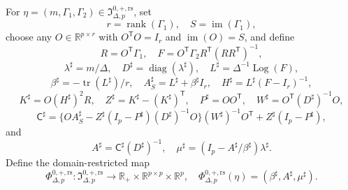 For \(\eta=(m,\Gamma_1,\Gamma_2)\in\mathfrak I_{\Delta,p}^{0,+,\mathrm{rs}}\), set
\[
 r=\operatorname{rank}(\Gamma_1),\quad S=\operatorname{im}(\Gamma_1),
\]
choose any \(O\in\mathbb R^{p\times r}\) with \(O^{\mathsf T}O=I_r\) and \(\operatorname{im}(O)=S\), and define
\[
 R=O^{\mathsf T}\Gamma_1,\quad
 F=O^{\mathsf T}\Gamma_2R^{\mathsf T}(RR^{\mathsf T})^{-1},
\]
\[
 \lambda^\sharp=m/\Delta,\quad D^\sharp=\operatorname{diag}(\lambda^\sharp),
 \quad L^\sharp=\Delta^{-1}\operatorname{Log}(F),
\]
\[
 \beta^\sharp=-\operatorname{tr}(L^\sharp)/r,\quad
 A_S^\sharp=L^\sharp+\beta^\sharp I_r,\quad
 H^\sharp=L^\sharp(F-I_r)^{-1},
\]
\[
 K^\sharp=O(H^\sharp)^2R,\quad
 Z^\sharp=K^\sharp-(K^\sharp)^{\mathsf T},\quad
 P^\sharp=OO^{\mathsf T},\quad
 W^\sharp=O^{\mathsf T}(D^\sharp)^{-1}O,
\]
\[
 \mathsf C^\sharp=
 \{OA_S^\sharp-Z^\sharp(I_p-P^\sharp)(D^\sharp)^{-1}O\}
 (W^\sharp)^{-1}O^{\mathsf T}+Z^\sharp(I_p-P^\sharp),
\]
and
\[
 A^\sharp=\mathsf C^\sharp(D^\sharp)^{-1},\quad
 \mu^\sharp=(I_p-A^\sharp/\beta^\sharp)\lambda^\sharp.
\]
Define the domain-restricted map
\[
 \Phi_{\Delta,p}^{0,+,\mathrm{rs}}:\mathfrak I_{\Delta,p}^{0,+,\mathrm{rs}}
 \longrightarrow\mathbb R_+\times\mathbb R^{p\times p}\times\mathbb R^p,
 \quad
 \Phi_{\Delta,p}^{0,+,\mathrm{rs}}(\eta)
 =(\beta^\sharp,A^\sharp,\mu^\sharp).
\]